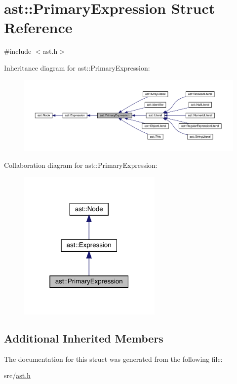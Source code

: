 \hypertarget{structast_1_1_primary_expression}{}\section{ast\+:\+:Primary\+Expression Struct Reference}
\label{structast_1_1_primary_expression}


{\ttfamily \#include $<$ast.\+h$>$}



Inheritance diagram for ast\+:\+:Primary\+Expression\+:\nopagebreak
\begin{figure}[H]
\begin{center}
\leavevmode
\includegraphics[width=350pt]{structast_1_1_primary_expression__inherit__graph}
\end{center}
\end{figure}


Collaboration diagram for ast\+:\+:Primary\+Expression\+:\nopagebreak
\begin{figure}[H]
\begin{center}
\leavevmode
\includegraphics[width=199pt]{structast_1_1_primary_expression__coll__graph}
\end{center}
\end{figure}
\subsection*{Additional Inherited Members}


The documentation for this struct was generated from the following file\+:\begin{DoxyCompactItemize}
\item 
src/\hyperlink{ast_8h}{ast.\+h}\end{DoxyCompactItemize}
